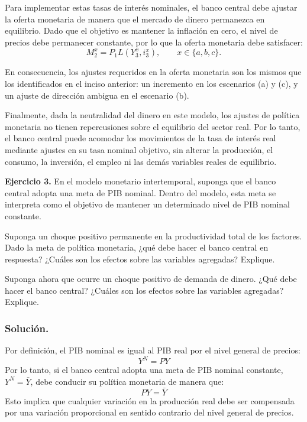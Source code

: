 \documentclass[11pt]{article}
\let\enumerateoriginal\enumerate
\let\endenumerateoriginal\endenumerate
\renewenvironment{enumerate}{%
  \enumerateoriginal
  \setlength{\itemsep}{0.5em}%
  \setlength{\parsep}{0pt}%
  \setlength{\topsep}{0.4em}%
}{\endenumerateoriginal}
\begin{document}
Para implementar estas tasas de interés nominales, el banco central debe ajustar la oferta monetaria de manera que el mercado de dinero permanezca en equilibrio. Dado que el objetivo es mantener la inflación en cero, el nivel de precios debe permanecer constante, por lo que la oferta monetaria debe satisfacer:
\[
M_2^x=P_1L(Y_3^x,i_3^x),
\qquad x\in\{a,b,c\}.
\]

En consecuencia, los ajustes requeridos en la oferta monetaria son los mismos que los identificados en el inciso anterior: un incremento en los escenarios (a) y (c), y un ajuste de dirección ambigua en el escenario (b).

Finalmente, dada la neutralidad del dinero en este modelo, los ajustes de política monetaria no tienen repercusiones sobre el equilibrio del sector real. Por lo tanto, el banco central puede acomodar los movimientos de la tasa de interés real mediante ajustes en su tasa nominal objetivo, sin alterar la producción, el consumo, la inversión, el empleo ni las demás variables reales de equilibrio.






\vspace{5em}

\textbf{Ejercicio 3.} En el modelo monetario intertemporal, suponga que el banco central adopta una meta de PIB nominal. Dentro del modelo, esta meta se interpreta como el objetivo de mantener un determinado nivel de PIB nominal constante.
\begin{enumerate}
  \item Suponga un choque positivo permanente en la productividad total de los factores. Dado la meta de política monetaria, ¿qué debe hacer el banco central en respuesta? ¿Cuáles son los efectos sobre las variables agregadas? Explique.

  \item Suponga ahora que ocurre un choque positivo de demanda de dinero. ¿Qué debe hacer el banco central? ¿Cuáles son los efectos sobre las variables agregadas? Explique.
\end{enumerate}




\subsubsection*{Solución.}
Por definición, el PIB nominal es igual al PIB real por el nivel general de precios:
\[
Y^N=PY
\]
Por lo tanto, si el banco central adopta una meta de PIB nominal constante, $Y^N=\bar Y$, debe conducir su política monetaria de manera que:
\[
PY=\bar Y
\]
Esto implica que cualquier variación en la producción real debe ser compensada por una variación proporcional en sentido contrario del nivel general de precios.
\end{document}
